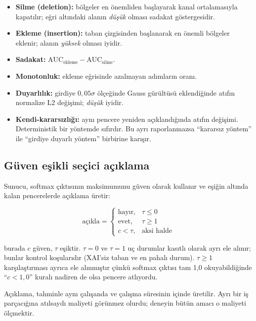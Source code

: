 \documentclass[conference]{IEEEtran}
\begin{document}
\begin{itemize}
\item \textbf{Silme (deletion):} bölgeler en önemliden başlayarak kanal
ortalamasıyla kapatılır; eğri altındaki alanın \emph{düşük} olması sadakat
göstergesidir.
\item \textbf{Ekleme (insertion):} taban çizgisinden başlanarak en önemli
bölgeler eklenir; alanın \emph{yüksek} olması iyidir.
\item \textbf{Sadakat:} $\mathrm{AUC}_{\mathrm{ekleme}} -
\mathrm{AUC}_{\mathrm{silme}}$.
\item \textbf{Monotonluk:} ekleme eğrisinde azalmayan adımların oranı.
\item \textbf{Duyarlılık:} girdiye $0{,}05\sigma$ ölçeğinde Gauss gürültüsü
eklendiğinde atıfın normalize L2 değişimi; \emph{düşük} iyidir.
\item \textbf{Kendi-kararsızlığı:} aynı pencere yeniden açıklandığında atıfın
değişimi. Deterministik bir yöntemde sıfırdır. Bu ayrı raporlanmazsa ``kararsız
yöntem'' ile ``girdiye duyarlı yöntem'' birbirine karışır.
\end{itemize}

\subsection{Güven eşikli seçici açıklama}

Sunucu, softmax çıktısının maksimumunu güven olarak kullanır ve eşiğin altında
kalan pencerelerde açıklama üretir:

\begin{equation}
\text{açıkla} =
\begin{cases}
\text{hayır}, & \tau \le 0\\
\text{evet}, & \tau \ge 1\\
c < \tau, & \text{aksi halde}
\end{cases}
\end{equation}

\noindent burada $c$ güven, $\tau$ eşiktir. $\tau = 0$ ve $\tau = 1$ uç durumlar
kasıtlı olarak ayrı ele alınır; bunlar kontrol koşularıdır (XAI'siz taban ve en
pahalı durum). $\tau \ge 1$ karşılaştırması ayrıca ele alınmıştır çünkü softmax
çıktısı tam 1{,}0 okuyabildiğinde ``$c < 1{,}0$'' kuralı nadiren de olsa
pencere atlıyordu.

Açıklama, tahminle aynı çalışanda ve çalışma süresinin içinde üretilir. Ayrı bir
iş parçacığına atılsaydı maliyeti görünmez olurdu; deneyin bütün amacı o maliyeti
ölçmektir.
\end{document}
